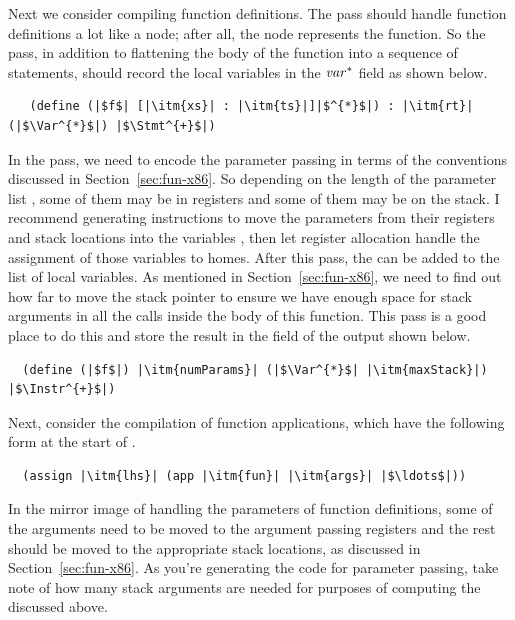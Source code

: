 \documentclass[11pt]{book}
\begin{document}
Next we consider compiling function definitions.  The 
pass should handle function definitions a lot like a 
node; after all, the  node represents the 
function. So the  pass, in addition to flattening the
body of the function into a sequence of statements, should record the
local variables in the $\mathit{var}^{*}$ field as shown below.
\begin{lstlisting}
   (define (|$f$| [|\itm{xs}| : |\itm{ts}|]|$^{*}$|) : |\itm{rt}| (|$\Var^{*}$|) |$\Stmt^{+}$|)
\end{lstlisting}
In the  pass, we need to encode the
parameter passing in terms of the conventions discussed in
Section~\ref{sec:fun-x86}. So depending on the length of the parameter
list , some of them may be in registers and some of them may
be on the stack. I recommend generating  instructions to
move the parameters from their registers and stack locations into the
variables , then let register allocation handle the assignment
of those variables to homes. After this pass, the  can be
added to the list of local variables. As mentioned in
Section~\ref{sec:fun-x86}, we need to find out how far to move the
stack pointer to ensure we have enough space for stack arguments in
all the calls inside the body of this function. This pass is a good
place to do this and store the result in the  field of
the output  shown below.
\begin{lstlisting}
  (define (|$f$|) |\itm{numParams}| (|$\Var^{*}$| |\itm{maxStack}|) |$\Instr^{+}$|)
\end{lstlisting}

Next, consider the compilation of function applications, which have
the following form at the start of .
\begin{lstlisting}
  (assign |\itm{lhs}| (app |\itm{fun}| |\itm{args}| |$\ldots$|))
\end{lstlisting}
In the mirror image of handling the parameters of function
definitions, some of the arguments  need to be moved to the
argument passing registers and the rest should be moved to the
appropriate stack locations, as discussed in
Section~\ref{sec:fun-x86}.
As you're generating the code for parameter passing, take note of how
many stack arguments are needed for purposes of computing the
 discussed above.
\end{document}
